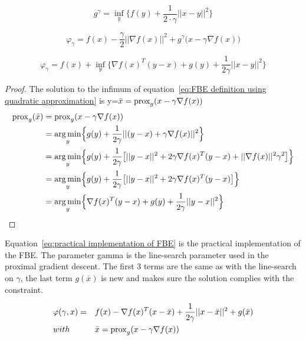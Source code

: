 		\begin{equation}
			g^{\gamma} = \underset{y}{\inf} \big \{f(y)+\frac{1}{2 \cdot \gamma}||x-y||^2 \big \}
			\label{eq:Moreau envelope}
		\end{equation}
		
		\begin{equation}
		\varphi_{\gamma} = f(x) - \frac{\gamma}{2}||\nabla f(x)||^2 + g^{\gamma} \big(x-\gamma \nabla f(x) \big)
		\label{eq:FBE definition using Moreau envelope}
		\end{equation}
		
		\begin{equation}
		\varphi_{\gamma} =   f(x) + \underset{y}{\inf} \Big\{ \nabla f(x)^T(y-x) + g(y) + \frac{1}{2 \gamma} ||x-y||^2  \Big\}
		\label{eq:FBE definition using quadratic approximation}
		\end{equation}
		
		\begin{proof}
			The solution to the infimum of equation~\ref{eq:FBE definition using quadratic approximation} is y=$\bar{x}= \operatorname{prox}_g(x-\gamma \nabla f(x))$
			\begin{align*}
			\operatorname{prox}_g(\bar{x}) 
			&=\operatorname{prox}_g(x- \gamma \nabla f(x)) \\
			&= \underset{y}{\operatorname*{arg\,min}} \Big \{ g(y) 
			+ \frac{1}{2 \gamma}||(y-x) + \gamma \nabla f(x)||^2 \Big \} \\
			&= \underset{y}{\operatorname*{arg\,min}} \Big \{ g(y) 
			+ \frac{1}{2 \gamma} \big[||y-x||^2 + 2 \gamma \nabla f(x)^T(y-x) + ||\nabla f(x)||^2\gamma^2 \big] \Big \} \\
			&= \underset{y}{\operatorname*{arg\,min}} \Big \{ g(y) 
			+ \frac{1}{2 \gamma} \big[||y-x||^2 + 2 \gamma \nabla f(x)^T(y-x)  \big] \Big \}\\
			&= \underset{y}{\operatorname*{arg\,min}} \Big \{   \nabla f(x)^T(y-x)  + g(y) 
			+ \frac{1}{2 \gamma} ||y-x||^2  \Big  \}
			\end{align*}
			\label{prf:prox is solution to FBE inf}
		\end{proof}
		
		Equation~\ref{eq:practical implementation of FBE} is the practical implementation of the FBE. The parameter gamma is the line-search parameter used in the proximal gradient descent. The first 3 terms are the same as with the line-search on $\gamma$, the last term $g(\bar{x})$ is new and makes sure the solution complies with the constraint.
		
%		
		\begin{equation}
			\begin{aligned}	
				& \varphi(\gamma,x)= 
				&& f(x) - \nabla f(x)^T(x-\bar{x}) + \frac{1}{2 \gamma}||x-\bar{x}||^2  + g(\bar{x})
				\\
				& with 
				&&\bar{x} = \operatorname{prox}_g( x - \gamma\nabla f(x)) 
			\end{aligned} 
			\label{eq:practical implementation of FBE}
		\end{equation}
		
